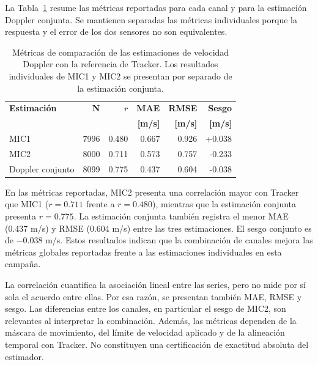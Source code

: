 La Tabla~\ref{tab:exp03_velocity_metrics} resume las métricas
reportadas para cada canal y para la estimación Doppler
conjunta. Se mantienen separadas las métricas individuales
porque la respuesta y el error de los dos sensores no son
equivalentes.

\begin{table}[htbp]
    \centering
    \caption{
        Métricas de comparación de las estimaciones de velocidad
        Doppler con la referencia de Tracker. Los resultados
        individuales de MIC1 y MIC2 se presentan por separado
        de la estimación conjunta.
    }
    \label{tab:exp03_velocity_metrics}
    \renewcommand{\arraystretch}{1.15}
    \setlength{\tabcolsep}{5pt}
    \begin{tabular}{lrrrrr}
        \hline
        \textbf{Estimación} &
        \textbf{N} &
        \textbf{$r$} &
        \textbf{MAE} &
        \textbf{RMSE} &
        \textbf{Sesgo} \\
        & & & \textbf{[m/s]} & \textbf{[m/s]} & \textbf{[m/s]} \\
        \hline
        MIC1 & 7996 & 0.480 & 0.667 & 0.926 & +0.038 \\
        MIC2 & 8000 & 0.711 & 0.573 & 0.757 & -0.233 \\
        Doppler conjunto & 8099 & 0.775 & 0.437 & 0.604 & -0.038 \\
        \hline
    \end{tabular}
\end{table}

En las métricas reportadas, MIC2 presenta una correlación
mayor con Tracker que MIC1 ($r=0.711$ frente a $r=0.480$),
mientras que la estimación conjunta presenta $r=0.775$.
La estimación conjunta también registra el menor MAE
(0.437 m/s) y RMSE (0.604 m/s) entre las tres estimaciones.
El sesgo conjunto es de $-0.038$ m/s. Estos resultados
indican que la combinación de canales mejora las métricas
globales reportadas frente a las estimaciones individuales
en esta campaña.

La correlación cuantifica la asociación lineal entre las
series, pero no mide por sí sola el acuerdo entre ellas.
Por esa razón, se presentan también MAE, RMSE y sesgo.
Las diferencias entre los canales, en particular el sesgo
de MIC2, son relevantes al interpretar la combinación.
Además, las métricas dependen de la máscara de movimiento,
del límite de velocidad aplicado y de la alineación temporal
con Tracker. No constituyen una certificación de exactitud
absoluta del estimador.

